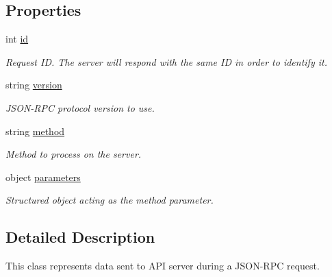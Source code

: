 \subsection*{Properties}
\begin{DoxyCompactItemize}
\item 
int \hyperlink{class_thecallr_api_1_1_json_1_1_json_request_a1d4768420076b42a6a32dd793caf6523}{id}
\begin{DoxyCompactList}\small\item\em Request I\+D. The server will respond with the same I\+D in order to identify it. \end{DoxyCompactList}\item 
string \hyperlink{class_thecallr_api_1_1_json_1_1_json_request_a167b1e5a74a478c3358eb642ce791c66}{version}
\begin{DoxyCompactList}\small\item\em J\+S\+O\+N-\/\+R\+P\+C protocol version to use. \end{DoxyCompactList}\item 
string \hyperlink{class_thecallr_api_1_1_json_1_1_json_request_aaab569b47d1872369cf4872fc27a7be8}{method}
\begin{DoxyCompactList}\small\item\em Method to process on the server. \end{DoxyCompactList}\item 
object \hyperlink{class_thecallr_api_1_1_json_1_1_json_request_a90783eb7527497449a7741cb9231acf8}{parameters}
\begin{DoxyCompactList}\small\item\em Structured object acting as the method parameter. \end{DoxyCompactList}\end{DoxyCompactItemize}


\subsection{Detailed Description}
This class represents data sent to A\+P\+I server during a J\+S\+O\+N-\/\+R\+P\+C request. 



